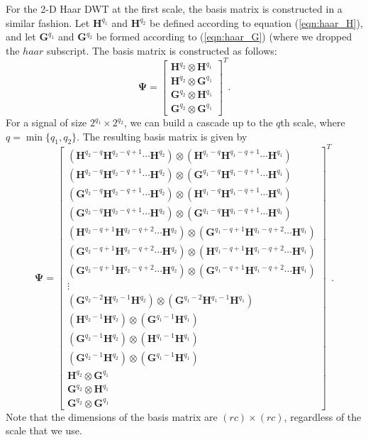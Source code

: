 For the 2-D Haar DWT at the first scale, the basis matrix is constructed in a similar fashion.
Let $\bm H^{q_1}$ and $\bm H^{q_2}$ be defined according to equation (\ref{eqn:haar_H}), and let $\bm G^{q_1}$ and $\bm G^{q_2}$  be formed according to (\ref{eqn:haar_G}) (where we dropped the $haar$ subscript. 
The basis matrix is constructed as follows:
\begin{equation*}
  \bm \Psi = 
  \begin{bmatrix}
    \bm H^{q_2} \otimes\bm H^{q_1} \\
    \bm H^{q_2} \otimes \bm G^{q_1} \\
    \bm G^{q_2} \otimes \bm H^{q_1} \\
    \bm G^{q_2} \otimes \bm G^{q_1} 
  \end{bmatrix}^T.
\end{equation*}
For a signal of size $2^{q_1}\times 2^{q_2}$, we can build a cascade up to the $q$th scale, where $q = \min\{q_1,q_2\}$.
The resulting basis matrix is given by
\begin{equation*}
\label{eqn:haar2_fullbasis}
  \bm \Psi = 
  \begin{bmatrix}
    (\bm H^{q_2-q}\bm H^{q_2-q+1} \cdots \bm H^{q_2}) \otimes (\bm H^{q_1-q} \bm H^{q_1-q+1}\cdots\bm H^{q_1}) \\
    (\bm H^{q_2-q}\bm H^{q_2-q+1} \cdots \bm H^{q_2}) \otimes (\bm G^{q_1-q} \bm H^{q_1-q+1}\cdots\bm H^{q_1}) \\
    (\bm G^{q_2-q}\bm H^{q_2-q+1} \cdots \bm H^{q_2}) \otimes (\bm H^{q_1-q} \bm H^{q_1-q+1}\cdots\bm H^{q_1}) \\
    (\bm G^{q_2-q}\bm H^{q_2-q+1} \cdots \bm H^{q_2}) \otimes (\bm G^{q_1-q} \bm H^{q_1-q+1}\cdots\bm H^{q_1}) \\
    (\bm H^{q_2-q+1}\bm H^{q_2-q+2} \cdots \bm H^{q_2}) \otimes (\bm G^{q_1-q+1} \bm H^{q_1-q+2}\cdots\bm H^{q_1}) \\
    (\bm G^{q_2-q+1}\bm H^{q_2-q+2} \cdots \bm H^{q_2}) \otimes (\bm H^{q_1-q+1} \bm H^{q_1-q+2}\cdots\bm H^{q_1}) \\
    (\bm G^{q_2-q+1}\bm H^{q_2-q+2} \cdots \bm H^{q_2}) \otimes (\bm G^{q_1-q+1} \bm H^{q_1-q+2}\cdots\bm H^{q_1}) \\
    \vdots \\
    (\bm G^{q_2-2}\bm H^{q_2-1} \bm H^{q_2}) \otimes (\bm G^{q_1-2}\bm H^{q_1-1}\bm H^{q_1}) \\
    (\bm H^{q_2-1} \bm H^{q_2}) \otimes (\bm G^{q_1-1}\bm H^{q_1}) \\
    (\bm G^{q_2-1} \bm H^{q_2}) \otimes (\bm H^{q_1-1}\bm H^{q_1}) \\
    (\bm G^{q_2-1} \bm H^{q_2}) \otimes (\bm G^{q_1-1}\bm H^{q_1}) \\
    \bm H^{q_2} \otimes \bm G^{q_1} \\
    \bm G^{q_2} \otimes \bm H^{q_1} \\
    \bm G^{q_2} \otimes \bm G^{q_1} 
  \end{bmatrix}^T.
\end{equation*}
Note that the dimensions of the basis matrix are $(rc)\times (rc)$, regardless of the scale that we use.

